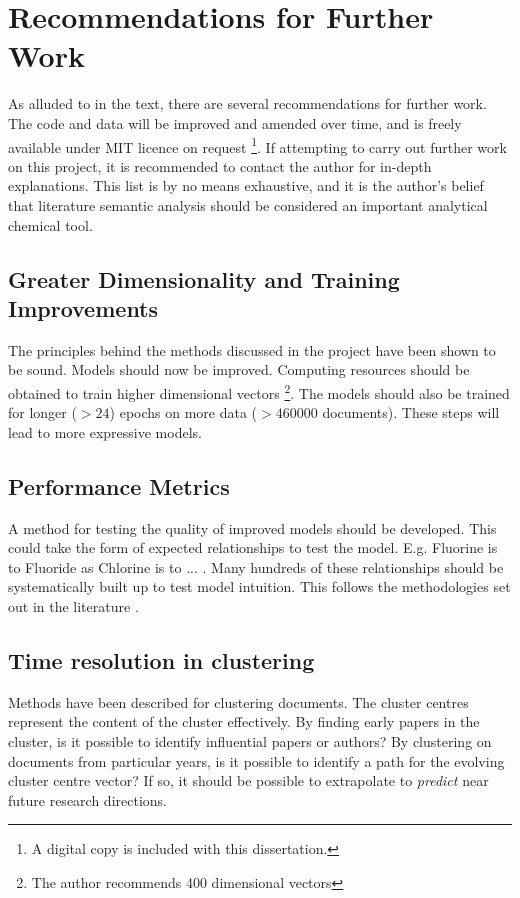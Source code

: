 \chapter{Recommendations for Further Work}
\label{chapt:RECOMMENDATIONS}
As alluded to in the text, there are several recommendations for further work. The code and data will be improved and amended over time, and is freely available under MIT licence on request \footnote{A digital copy is included with this dissertation.}. If attempting to carry out further work on this project, it is recommended to contact the author for in-depth explanations. This list is by no means exhaustive, and it is the author's belief that literature semantic analysis should be considered an important analytical chemical tool.
\section{Greater Dimensionality and Training Improvements}
The principles behind the methods discussed in the project have been shown to be sound. Models should now be improved. Computing resources should be obtained to train higher dimensional vectors \footnote{ The author recommends 400 dimensional vectors}. The models should also be trained for longer ($\gt 24$) epochs on more data ($\gt 460000$ documents). These steps will lead to more expressive models.
\section{Performance Metrics}
A method for testing the quality of improved models should be developed. This could take the form of expected relationships to test the model. E.g. Fluorine is to Fluoride as Chlorine is to ... . Many hundreds of these relationships should be systematically built up to test model intuition. This follows the methodologies set out in the literature \cite{word2vec1} \cite{word2vec2}.
\section{Time resolution in clustering}
Methods have been described for clustering documents. The cluster centres represent the content of the cluster effectively. By finding early papers in the cluster, is it possible to identify influential papers or authors?
By clustering on documents from particular years, is it possible to identify a path for the evolving cluster centre vector? If so, it should be possible to extrapolate to \emph{predict} near future research directions.
